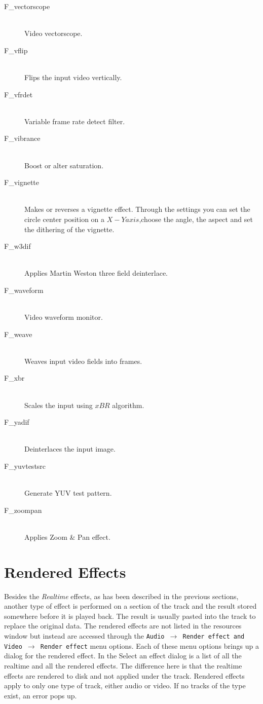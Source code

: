 \begin{description}
\item [F\_vectorscope]~\\Video vectorscope.
\item [F\_vflip]~\\Flips the input video vertically.
\item [F\_vfrdet]~\\Variable frame rate detect filter.
\item [F\_vibrance]~\\Boost or alter saturation.
\item [F\_vignette]~\\Makes or reverses a vignette
  effect. Through the settings you can set the circle center position
  on a $X-Y axis$,choose the angle, the aspect and set the dithering
  of the vignette.
\item [F\_w3dif]~\\Applies Martin Weston three field
  deinterlace.
\item [F\_waveform]~\\Video waveform monitor.
\item [F\_weave]~\\Weaves input video fields into frames.
\item [F\_xbr]~\\Scales the input using $xBR$ algorithm.
\item [F\_yadif]~\\Deinterlaces the input image.
\item [F\_yuvtestsrc]~\\Generate YUV test pattern.
\item [F\_zoompan]~\\Applies Zoom \& Pan effect.
\end{description}


\section[Rendered Effects]{Rendered Effects}%
\label{sec:rendered_effects}

Besides the \textit{Realtime} effects, as has been described in the previous sections, another type of effect is performed on a section of the track and the result stored somewhere before it is played back. The result is usually pasted into the track to replace the original data. The rendered effects are not listed in the resources window but instead are accessed through the \texttt{Audio $\rightarrow$ Render effect and Video $\rightarrow$ Render effect} menu options. Each of these menu options brings up a dialog for the rendered effect. In the Select an effect dialog is a list of all the realtime and all the rendered effects. The difference here is that the realtime effects are rendered to disk and not applied under the track. Rendered effects apply to only one type of track, either audio or video. If no tracks of the type exist, an error pops up.

